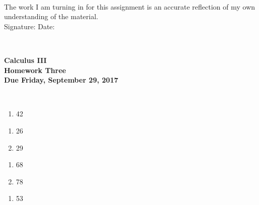 \documentclass[12pt]{article}
\begin{document}
\\

\bigskip
\bigskip
\bigskip
\bigskip
\bigskip
\bigskip
\noindent The work I am turning in for this assignment is an accurate
reflection of my own understanding of the material.\\[14pt]

\noindent Signature: \underline{\hspace{7cm}} \hspace{1cm} Date:
\underline{\hspace{5cm}} 


\hspace{2mm}\\
\newpage



 
\begin{center}
{\large {\bf Calculus III}}\\
\medskip
{\large {\bf Homework Three}}\\
\medskip
{ {\bf Due Friday, September 29, 2017}}\\
\end{center}

\hspace{2mm}\\



\begin{enumerate}
\setlength{\itemsep}{-1mm}
  \item 42
\end{enumerate}

\begin{enumerate}
\setlength{\itemsep}{-1mm}
  \item 26
  \item 29
\end{enumerate}

\begin{enumerate}
\setlength{\itemsep}{-1mm}
  \item 68
  \item 78
\end{enumerate}

\begin{enumerate}
\setlength{\itemsep}{-1mm}
  \item 53
\end{enumerate}
\end{document}
